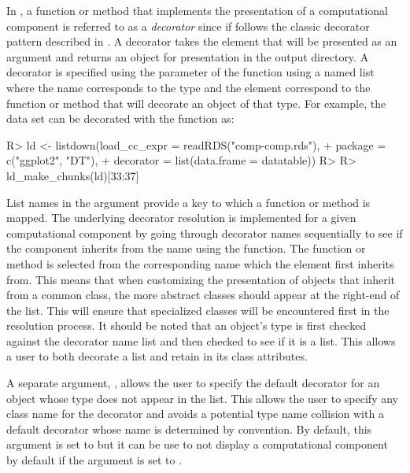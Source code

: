 \documentclass[
]{jss}
\begin{document}
In , a function or method that implements the presentation
of a computational component is referred to as a \emph{decorator} since
if follows the classic decorator pattern described in \citet{gamma1995}.
A decorator takes the element that will be presented as an argument and
returns an object for presentation in the output directory. A decorator
is specified using the  parameter of the
 function using a named list where the name corresponds
to the type and the element correspond to the function or method that
will decorate an object of that type. For example, the 
data set can be decorated with the  function
\citep{xie2020} as:

\begin{CodeChunk}
\begin{CodeInput}
R> ld <- listdown(load_cc_expr = readRDS("comp-comp.rds"), 
+                package = c("ggplot2", "DT"),
+                decorator = list(data.frame = datatable))
R> 
R> ld_make_chunks(ld)[33:37]
\end{CodeInput}
\end{CodeChunk}

List names in the  argument provide a key to which a
function or method is mapped. The underlying decorator resolution is
implemented for a given computational component by going through
decorator names sequentially to see if the component inherits from the
name using the  function. The function or method is
selected from the corresponding name which the element first inherits
from. This means that when customizing the presentation of objects that
inherit from a common class, the more abstract classes should appear at
the right-end of the list. This will ensure that specialized classes
will be encountered first in the resolution process. It should be noted
that an object's type is first checked against the decorator name list
and then checked to see if it is a list. This allows a user to both
decorate a list and retain  in its class attributes.

A separate argument, , allows the user to
specify the default decorator for an object whose type does not appear
in the  list. This allows the user to specify any class
name for the decorator and avoids a potential type name collision with a
default decorator whose name is determined by convention. By default,
this argument is set to  but it can be use to not display
a computational component by default if the argument is set to
.
\end{document}
